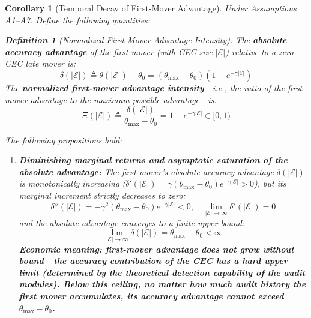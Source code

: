 \documentclass[12pt,a4paper]{article}
\newtheorem{corollary}[theorem]{Corollary}
\theoremstyle{definition}
\newtheorem{definition}{Definition}[section]
\theoremstyle{remark}
\begin{document}
\begin{corollary}[Temporal Decay of First-Mover Advantage]
\label{cor:first-mover-decay}
Under Assumptions A1--A7. Define the following quantities:

\begin{definition}[Normalized First-Mover Advantage Intensity]
The \textbf{absolute accuracy advantage} of the first mover (with CEC size $|\mathcal{E}|$) relative to a zero-CEC late mover is:
\begin{equation}
\delta(|\mathcal{E}|) \triangleq \theta(|\mathcal{E}|) - \theta_0 = (\theta_{\max} - \theta_0)(1 - e^{-\gamma |\mathcal{E}|})
\end{equation}
The \textbf{normalized first-mover advantage intensity}—i.e., the ratio of the first-mover advantage to the maximum possible advantage—is:
\begin{equation}
\Xi(|\mathcal{E}|) \triangleq \frac{\delta(|\mathcal{E}|)}{\theta_{\max} - \theta_0} = 1 - e^{-\gamma |\mathcal{E}|} \in [0, 1)
\end{equation}
\end{definition}

The following propositions hold:

\begin{enumerate}[label=(\roman*), itemsep=6pt]
\item \textbf{Diminishing marginal returns and asymptotic saturation of the absolute advantage:} The first mover's absolute accuracy advantage $\delta(|\mathcal{E}|)$ is monotonically increasing ($\delta'(|\mathcal{E}|) = \gamma(\theta_{\max} - \theta_0)e^{-\gamma |\mathcal{E}|} > 0$), but its \textit{marginal increment} strictly decreases to zero:
\begin{equation}
\delta''(|\mathcal{E}|) = -\gamma^2 (\theta_{\max} - \theta_0) e^{-\gamma |\mathcal{E}|} < 0, \quad \lim_{|\mathcal{E}| \to \infty} \delta'(|\mathcal{E}|) = 0
\end{equation}
and the absolute advantage converges to a finite upper bound:
\begin{equation}
\lim_{|\mathcal{E}| \to \infty} \delta(|\mathcal{E}|) = \theta_{\max} - \theta_0 < \infty
\end{equation}
\textbf{Economic meaning: first-mover advantage does not grow without bound—the accuracy contribution of the CEC has a hard upper limit (determined by the theoretical detection capability of the audit modules). Below this ceiling, no matter how much audit history the first mover accumulates, its accuracy advantage cannot exceed $\theta_{\max} - \theta_0$.}


\end{enumerate}
\end{corollary}
\end{document}
